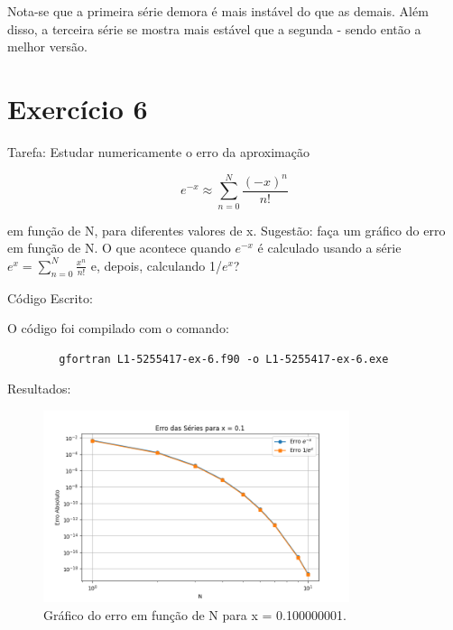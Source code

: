 \documentclass[12pt, a4paper]{article} %
\begin{document}
    Nota-se que a primeira s\'erie demora \'e mais inst\'avel do que as demais. Al\'em disso, a terceira s\'erie se mostra mais est\'avel que a segunda - sendo ent\~ao a melhor vers\~ao.

\section{Exerc\'icio 6}

    Tarefa: Estudar numericamente o erro da aproxima\c{c}\~ao

    \begin{equation} e^{-x} \approx \sum_{n=0}^N \frac{(-x)^n}{n!} \end{equation}

    em fun\c{c}\~ao de N, para diferentes valores de x. Sugest\~ao: fa\c{c}a um gr\'afico do erro em fun\c{c}\~ao de N. O que acontece quando $e^{-x}$  \'e calculado usando a s\'erie $e^x = \sum_{n=0}^{N} \frac{x^n}{n!}$ e, depois, calculando 1/$e^x$?

    C\'odigo Escrito:
    

    O c\'odigo foi compilado com o comando:
    \begin{verbatim}
        gfortran L1-5255417-ex-6.f90 -o L1-5255417-ex-6.exe
    \end{verbatim}

    Resultados:
    \begin{figure}[H]
        \centering
        \includegraphics[width=0.8\textwidth]{../images/erro_x_0_1.png}
        \caption{Gr\'afico do erro em fun\c{c}\~ao de N para x = 0.100000001.}
    \end{figure}
\end{document}
